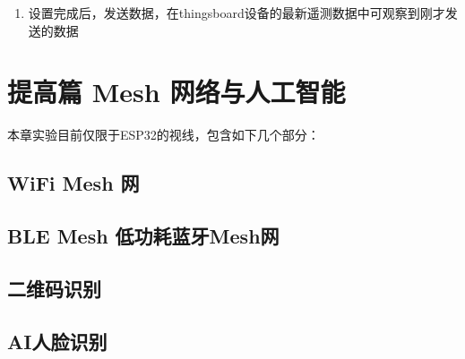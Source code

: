 \documentclass[a4paper,12pt,english]{sphinxmanual}
\begin{document}
{{\begin{enumerate}
\begin{enumerate}
\item {} 
\sphinxAtStartPar
填写如下键值对：
\begin{itemize}
\item {} 
\sphinxAtStartPar
key:	ThingsBoardAccessToken

\item {} 
\sphinxAtStartPar
Value: 刚才在thingsboard中复制的访问令牌

\end{itemize}

\end{enumerate}

\item {} 
\sphinxAtStartPar
设置完成后，发送数据，在thingsboard设备的最新遥测数据中可观察到刚才发送的数据

\end{enumerate}

\sphinxstepscope


\chapter{提高篇\sphinxhyphen{} Mesh 网络与人工智能}
\label{\detokenize{exp-advanced/index:mesh}}\label{\detokenize{exp-advanced/index::doc}}
\sphinxAtStartPar
本章实验目前仅限于ESP32的视线，包含如下几个部分：

\sphinxstepscope


\section{WiFi Mesh 网}
\label{\detokenize{exp-advanced/wifi-mesh:wifi-mesh}}\label{\detokenize{exp-advanced/wifi-mesh::doc}}
\sphinxstepscope


\section{BLE Mesh \sphinxhyphen{} 低功耗蓝牙Mesh网}
\label{\detokenize{exp-advanced/ble-mesh:ble-mesh-mesh}}\label{\detokenize{exp-advanced/ble-mesh::doc}}
\sphinxstepscope


\section{二维码识别}
\label{\detokenize{exp-advanced/code-recognition:id1}}\label{\detokenize{exp-advanced/code-recognition::doc}}
\sphinxstepscope


\section{AI人脸识别}
\label{\detokenize{exp-advanced/ai-face-detection:ai}}\label{\detokenize{exp-advanced/ai-face-detection::doc}}
\sphinxstepscope


}}
\end{document}
